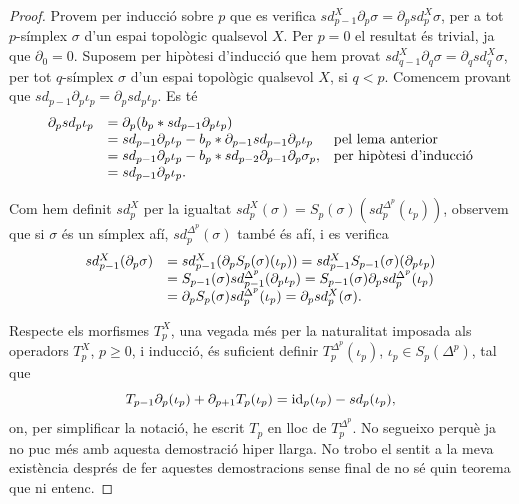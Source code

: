 \documentclass[../main.tex]{subfiles}
\begin{document}
\begin{enumerate}
\begin{proof}
    Provem per inducció sobre $p$ que es verifica $sd_{p-1}^X\partial_p\sigma = \partial_psd_p^X\sigma$, per a tot $p$-símplex $\sigma$ d'un espai topològic qualsevol $X$. Per $p = 0$ el resultat és trivial, ja que $\partial_0 = 0$. Suposem per hipòtesi d'inducció que hem provat $sd_{q-1}^X\partial_q\sigma = \partial_qsd_q^X\sigma$, per tot $q$-símplex $\sigma$ d'un espai topològic qualsevol $X$, si $q<p$. Comencem provant que $sd_{p-1}\partial_p\iota_p = \partial_psd_p\iota_p$. Es té
    \begin{equation}
        \notag
        \begin{array}{lll}
            \partial_psd_p\iota_p &= \partial_p(b_p*sd_{p-1}\partial_p\iota_p) & \\
            & = sd_{p-1}\partial_p\iota_p-b_p*\partial_{p-1}sd_{p-1}\partial_p\iota_p & \text{pel lema anterior} \\
            & = sd_{p-1}\partial_p\iota_p-b_p*sd_{p-2}\partial_{p-1}\partial_p\sigma_p, & \text{per hipòtesi d'inducció}\\
            & = sd_{p-1}\partial_p\iota_p.
        \end{array}
    \end{equation}
    
    Com hem definit $sd_p^X$ per la igualtat $sd_p^X(\sigma) = S_p(\sigma)(sd_p^{\Delta^p}(\iota_p))$, observem que si $\sigma$ és un símplex afí, $sd_p^{\Delta^p}(\sigma)$ també és afí, i es verifica
    \begin{equation}
        \notag
        \begin{array}{ll}
            sd_{p-1}^X(\partial_p\sigma) & = sd_{p-1}^X(\partial_pS_p(\sigma)(\iota_p)) = sd_{p-1}^XS_{p-1}(\sigma)(\partial_p\iota_p)\\
            &= S_{p-1}(\sigma)sd_{p-1}^{\Delta^p}(\partial_p\iota_p) = S_{p-1}(\sigma)\partial_psd_p^{\Delta^p}(\iota_p)\\
            & = \partial_pS_p(\sigma)sd_p^{\Delta^p}(\iota_p) = \partial_psd_p^X(\sigma).
        \end{array}
    \end{equation}
    
    Respecte els morfismes $T_p^X$, una vegada més per la naturalitat imposada als operadors $T_p^X$, $p\geq 0$, i inducció, és suficient definir $T_p^{\Delta^p}(\iota_p)$, $\iota_p\in S_p(\Delta^p)$, tal que
    \begin{equation}
        \notag
        T_{p-1}\partial_p(\iota_p)+\partial_{p+1}T_p(\iota_p) = \mathrm{id}_p(\iota_p)-sd_p(\iota_p),
    \end{equation}
    on, per simplificar la notació, he escrit $T_p$ en lloc de $T_p^{\Delta^p}$. No segueixo perquè ja no puc més amb aquesta demostració hiper llarga. No trobo el sentit a la meva existència després de fer aquestes demostracions sense final de no sé quin teorema que ni entenc.
    

\end{proof}
\end{enumerate}
\end{document}
